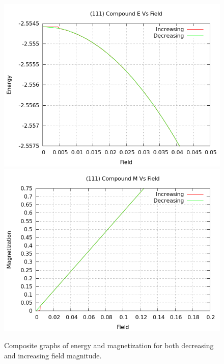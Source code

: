 \documentclass{article}
\begin{document}
\begin{figure}[ht]
\centering
\includegraphics[scale=0.6]{HVariedData/compoundEM/111Ecompound.png}
\includegraphics[scale=0.6]{HVariedData/compoundEM/111Mcompound.png}
\caption{Composite graphs of energy and magnetization for both decreasing and increasing field magnitude.}
\end{figure}
\clearpage
\end{document}
